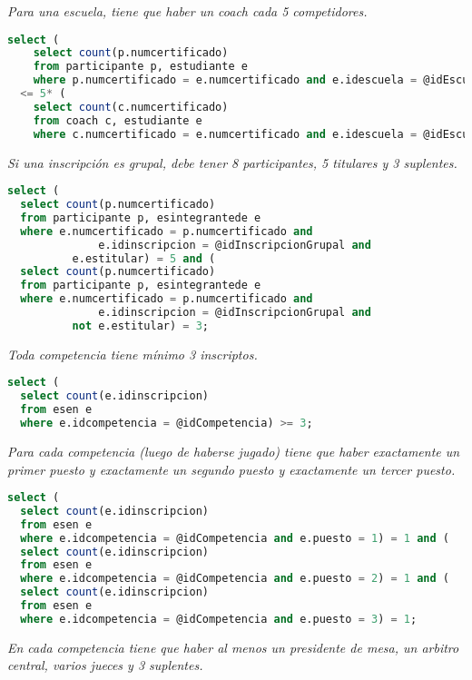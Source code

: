

\emph{Para una escuela, tiene que haber un coach cada 5 competidores.}

\begin{lstlisting}[language=SQL]
select (
    select count(p.numcertificado)
    from participante p, estudiante e
    where p.numcertificado = e.numcertificado and e.idescuela = @idEscuela)
  <= 5* (
    select count(c.numcertificado)
    from coach c, estudiante e
    where c.numcertificado = e.numcertificado and e.idescuela = @idEscuela);
\end{lstlisting}

\emph{Si una inscripción es grupal, debe tener 8 participantes, 5 titulares y 3 suplentes.}

\begin{lstlisting}[language=SQL]
select (
  select count(p.numcertificado)
  from participante p, esintegrantede e
  where e.numcertificado = p.numcertificado and
              e.idinscripcion = @idInscripcionGrupal and
	      e.estitular) = 5 and (
  select count(p.numcertificado)
  from participante p, esintegrantede e
  where e.numcertificado = p.numcertificado and
              e.idinscripcion = @idInscripcionGrupal and
	      not e.estitular) = 3;
\end{lstlisting}

\emph{Toda competencia tiene mínimo 3 inscriptos.}

\begin{lstlisting}[language=SQL]
select (
  select count(e.idinscripcion)
  from esen e
  where e.idcompetencia = @idCompetencia) >= 3;
\end{lstlisting}

\emph{Para cada competencia (luego de haberse jugado) tiene que haber exactamente un primer puesto y exactamente un segundo puesto y exactamente un tercer puesto.}

\begin{lstlisting}[language=SQL]
select (
  select count(e.idinscripcion)
  from esen e
  where e.idcompetencia = @idCompetencia and e.puesto = 1) = 1 and (
  select count(e.idinscripcion)
  from esen e
  where e.idcompetencia = @idCompetencia and e.puesto = 2) = 1 and (
  select count(e.idinscripcion)
  from esen e
  where e.idcompetencia = @idCompetencia and e.puesto = 3) = 1;
\end{lstlisting}

\emph{En cada competencia tiene que haber al menos un presidente de mesa, un arbitro central, varios jueces y 3 suplentes.}


